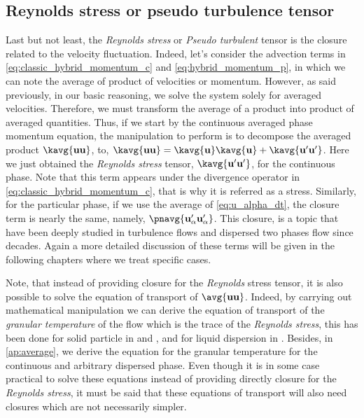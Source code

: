 \subsection{Reynolds stress or pseudo turbulence tensor}

Last but not least, the \textit{Reynolds stress} or \textit{Pseudo turbulent} tensor is the closure related to the velocity fluctuation. 
Indeed, let's consider the advection terms in \ref{eq:classic_hybrid_momentum_c} and \ref{eq:hybrid_momentum_p}, in which we can note the average of product of velocities or momentum. 
However, as said previously, in our basic reasoning, we solve the system solely for averaged velocities.
Therefore, we must transform the average of a product into product of averaged quantities. 
Thus, if we start by the continuous averaged phase momentum equation, the manipulation to perform is to decompose the averaged product $\kavg{\textbf{u} \textbf{u}}$, to, $\kavg{\textbf{u} \textbf{u}} = \kavg{\textbf{u}} \kavg{\textbf{u}} + \kavg{\textbf{u}' \textbf{u}'}$. 
Here we just obtained the \textit{Reynolds stress} tensor, $\kavg{\textbf{u}' \textbf{u}'}$, for the continuous phase. 
Note that this term appears under the divergence operator in \ref{eq:classic_hybrid_momentum_c}, that is why it is referred as a stress. 
Similarly, for the particular phase, if we use the average of \ref{eq:u_alpha_dt}, the closure term is nearly the same, namely, $\pnavg{\textbf{u}_\alpha'\textbf{u}_\alpha'}$.
This closure, is a topic that have been deeply studied in turbulence flows and dispersed two phases flow since decades. 
Again a more detailed discussion of these terms will be given in the following chapters where we treat specific cases. 

Note, that instead of providing closure for the \textit{Reynolds} stress tensor, it is also possible to solve the equation of transport of $\avg{\textbf{uu}}$. 
Indeed, by carrying out mathematical manipulation we can derive the equation of transport of the \textit{granular temperature} of the flow which is the trace of the \textit{Reynolds stress}, this has been done for solid particle in \citet{jackson2000dynamics} and \citet{nott2011suspension}, and for liquid dispersion in \citet{morel2015mathematical}.
Besides, in \ref{ap:average}, we derive the equation for the granular temperature for the continuous and arbitrary dispersed phase. 
Even though it is in some case practical to solve these equations instead of providing directly closure for the \textit{Reynolds stress}, it must be said that these equations of transport will also need closures which are not necessarily simpler. 

